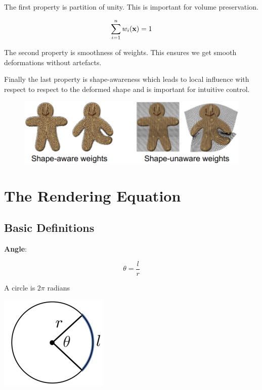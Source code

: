 \documentclass{article}
\begin{document}
The first property is partition of unity. This is important for volume preservation.

\[
    \sum_{i=1}^{n} w_i (\text{\textbf{x}}) = 1
\]

The second property is smoothness of weights. This ensures we get smooth deformations without artefacts.

\vspace{5px}

Finally the last property is shape-awareness which leads to local influence with respect to respect to the
deformed shape and is important for intuitive control.

\begin{figure}[!ht]
    \centering
    \includegraphics[width=0.5\linewidth]{images/shape_aware_vs_shape_unaware.png}
\end{figure}


\newpage

\section{The Rendering Equation}

\subsection{Basic Definitions}

\textbf{Angle}: 

\begin{minipage}{0.435\textwidth}
    \[
        \theta = \frac{l}{r}
    \]
    \begin{center}
        A circle is \(2\pi\) radians
    \end{center}
\end{minipage}
\begin{minipage}{0.435\textwidth}
    \includegraphics[width=0.3\linewidth]{images/radians.png}
\end{minipage}
\end{document}
